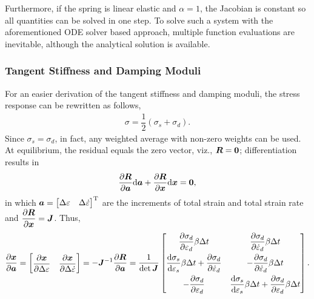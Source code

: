 Furthermore, if the spring is linear elastic and $\alpha=1$, the Jacobian is constant so all quantities can be solved in one step.
To solve such a system with the aforementioned ODE solver based approach, multiple function evaluations are inevitable, although the analytical solution is available.
\subsubsection{Tangent Stiffness and Damping Moduli}
For an easier derivation of the tangent stiffness and damping moduli, the stress response can be rewritten as follows,
\begin{gather}
\sigma=\dfrac{1}{2}\left(\sigma_s+\sigma_d\right).
\end{gather}
Since $\sigma_s=\sigma_d$, in fact, any weighted average with non-zero weights can be used.
At equilibrium, the residual equals the zero vector, viz., $\bm{R}=\bm{0}$; differentiation results in
\begin{gather}
\dfrac{\partial{\bm{R}}}{\partial{\bm{a}}}\mathrm{d}\bm{a}+\dfrac{\partial{\bm{R}}}{\partial{\bm{x}}}\mathrm{d}\bm{x}=\bm{0},
\end{gather}
in which $\bm{a}=\begin{bmatrix}
\Delta\varepsilon&\Delta\dot\varepsilon
\end{bmatrix}^{\mathrm{T}}$ are the increments of total strain and total strain rate and $\dfrac{\partial{\bm{R}}}{\partial{\bm{x}}}=\bm{J}$. Thus,
\begin{gather}\label{eq:internal}
\dfrac{\partial{\bm{x}}}{\partial{\bm{a}}}=\begin{bmatrix}\dfrac{\partial{\bm{x}}}{\partial{\Delta\varepsilon}}&\dfrac{\partial{\bm{x}}}{\partial{\Delta\dot\varepsilon}}\end{bmatrix}=-\bm{J}^{-1}\dfrac{\partial{\bm{R}}}{\partial{\bm{a}}}=\dfrac{1}{\det{\bm{J}}}\begin{bmatrix}
	\dfrac{\partial{\sigma_d}}{\partial{\varepsilon_d}}\beta\Delta{}t                                               & \dfrac{\partial{\sigma_d}}{\partial{\dot\varepsilon_d}}\beta\Delta{}t                                                     \\[3mm]
	\dfrac{\mathrm{d}\sigma_s}{\mathrm{d}\varepsilon_s}\beta\Delta{}t+\dfrac{\partial{\sigma_d}}{\partial{\dot\varepsilon_d}} & -\dfrac{\partial{\sigma_d}}{\partial{\dot\varepsilon_d}}\beta\Delta{}t                                                    \\[3mm]
	-\dfrac{\partial{\sigma_d}}{\partial{\varepsilon_d}}                                                            & \dfrac{\mathrm{d}\sigma_s}{\mathrm{d}\varepsilon_s}\beta\Delta{}t+\dfrac{\partial{\sigma_d}}{\partial{\varepsilon_d}}\beta\Delta{}t
\end{bmatrix}.
\end{gather}
